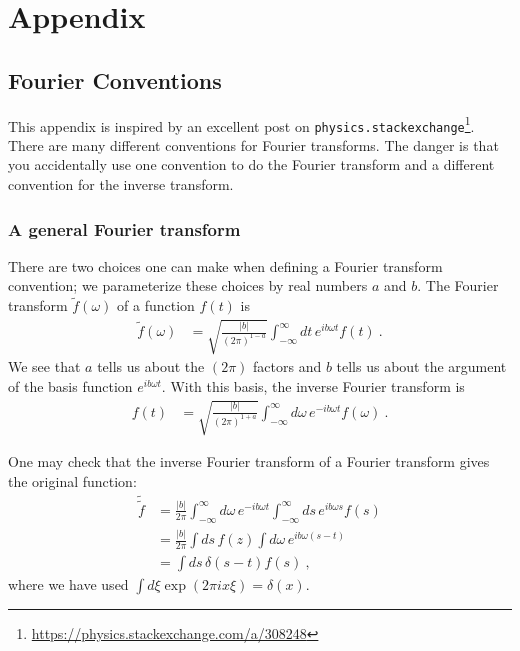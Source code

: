 \documentclass[
  11pt,
	colorful,
	raggedright,
]{tufte-style-thesis-flip}
\begin{document}
\part*{Appendix}
\appendix



\chapter{Fourier Conventions}
\label{app:Fourier}

This appendix is inspired by an excellent post on \texttt{physics.stackexchange}\footnote{\url{https://physics.stackexchange.com/a/308248}}. There are many different conventions for Fourier transforms. The danger is that you accidentally use one convention to do the Fourier transform and a different convention for the inverse transform. 

\section{A general Fourier transform}

There are two choices one can make when defining a Fourier transform convention; we parameterize these choices by real numbers $a$ and $b$. The Fourier transform $\tilde f(\omega)$ of a function $f(t)$ is
\begin{align}
  \tilde f(\omega)
  &= 
  \sqrt{\frac{|b|}{(2\pi)^{1-a}}}
  \int_{-\infty}^\infty dt\, e^{ib\omega t} f(t) \ .
\end{align}
We see that $a$ tells us about the $(2\pi)$ factors and $b$ tells us about the argument of the basis function $e^{ib\omega t}$. With this basis, the inverse Fourier transform is 
\begin{align}
  f(t)&=
  \sqrt{\frac{|b|}{(2\pi)^{1+a}}}
  \int_{-\infty}^\infty d\omega\, e^{-ib\omega t} f(\omega) \ .
\end{align}

One may check that the inverse Fourier transform of a Fourier transform gives the original function:
\begin{align}
  \tilde{\tilde f} &=
  \frac{|b|}{2\pi}
  \int_{-\infty}^\infty d\omega\, e^{-ib\omega t}
  \int_{-\infty}^{\infty}
  ds\, e^{ib\omega s} f(s)
  \\
  &= 
  \frac{|b|}{2\pi}
  \int ds\, f(z) \int d\omega \, e^{ib\omega(s-t)}
  \\
  &= \int ds\, \delta(s-t) f(s) \ ,
\end{align}
where we have used $\int d\xi \exp(2\pi i x\xi) = \delta(x)$. 
\end{document}
